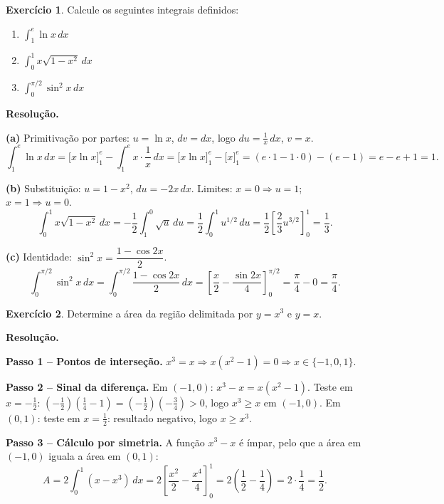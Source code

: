 \documentclass[12pt,a4paper]{article}
\theoremstyle{definition}
\newtheorem{exercise}{Exercício}[section]
\theoremstyle{remark}
\begin{document}
\begin{exercise}
  Calcule os seguintes integrais definidos:
  \begin{enumerate}[label=(\alph*)]
    \item $\displaystyle\int_1^e \ln x\,dx$
    \item $\displaystyle\int_0^1 x\sqrt{1-x^2}\,dx$
    \item $\displaystyle\int_0^{\pi/2}\sin^2 x\,dx$
  \end{enumerate}

  \medskip\textbf{Resolução.}

  \textbf{(a)} Primitivação por partes: $u=\ln x$, $dv=dx$, logo
  $du=\frac{1}{x}\,dx$, $v=x$.
  \[
    \int_1^e \ln x\,dx = \Big[x\ln x\Big]_1^e - \int_1^e x\cdot\frac{1}{x}\,dx
    = \Big[x\ln x\Big]_1^e - \Big[x\Big]_1^e
    = (e\cdot 1 - 1\cdot 0)-(e-1) = e - e + 1 = 1.
  \]

  \textbf{(b)} Substituição: $u=1-x^2$, $du=-2x\,dx$.
  Limites: $x=0\Rightarrow u=1$; $x=1\Rightarrow u=0$.
  \[
    \int_0^1 x\sqrt{1-x^2}\,dx = -\frac{1}{2}\int_1^0 \sqrt{u}\,du
    = \frac{1}{2}\int_0^1 u^{1/2}\,du
    = \frac{1}{2}\left[\frac{2}{3}u^{3/2}\right]_0^1 = \frac{1}{3}.
  \]

  \textbf{(c)} Identidade: $\sin^2 x = \dfrac{1-\cos 2x}{2}$.
  \[
    \int_0^{\pi/2}\sin^2 x\,dx = \int_0^{\pi/2}\frac{1-\cos 2x}{2}\,dx
    = \left[\frac{x}{2}-\frac{\sin 2x}{4}\right]_0^{\pi/2}
    = \frac{\pi}{4} - 0 = \frac{\pi}{4}.
  \]
\end{exercise}

\begin{exercise}
  Determine a área da região delimitada por $y=x^3$ e $y=x$.

  \medskip\textbf{Resolução.}

  \textbf{Passo 1 -- Pontos de interseção.} $x^3=x \Rightarrow x(x^2-1)=0
  \Rightarrow x\in\{-1,0,1\}$.

  \textbf{Passo 2 -- Sinal da diferença.} Em $(-1,0)$: $x^3-x = x(x^2-1)$.
  Teste em $x=-\tfrac{1}{2}$: $(-\tfrac{1}{2})({\tfrac{1}{4}-1})=(-\tfrac{1}{2})(-\tfrac{3}{4})>0$,
  logo $x^3\geq x$ em $(-1,0)$.
  Em $(0,1)$: teste em $x=\tfrac{1}{2}$: resultado negativo, logo $x\geq x^3$.

  \textbf{Passo 3 -- Cálculo por simetria.} A função $x^3-x$ é ímpar, pelo que
  a área em $(-1,0)$ iguala a área em $(0,1)$:
  \[
    A = 2\int_0^1(x-x^3)\,dx = 2\left[\frac{x^2}{2}-\frac{x^4}{4}\right]_0^1
    = 2\left(\frac{1}{2}-\frac{1}{4}\right) = 2\cdot\frac{1}{4} = \frac{1}{2}.
  \]
\end{exercise}
\end{document}
